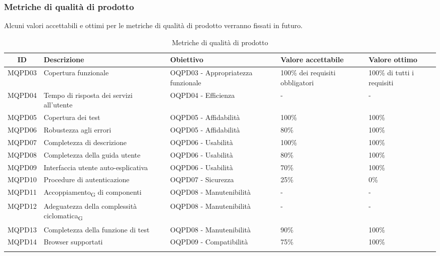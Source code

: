 \newpage
\subsubsection{Metriche di qualità di prodotto}
Alcuni valori accettabili e ottimi per le metriche di qualità di prodotto verranno fissati in futuro.
\begin{center}
	\setlength\extrarowheight{2pt}
	\begin{xltabular}{\textwidth}{|c|X|X|X|X|}
		\hline
		\textbf{ID} & \textbf{Descrizione} & \textbf{Obiettivo} & \textbf{Valore accettabile} & \textbf{Valore ottimo}\\
		\hline
		MQPD03 & Copertura funzionale & OQPD03 - Appropriatezza funzionale & 100\% dei requisiti obbligatori & 100\% di tutti i requisiti\\
		\hline
		MQPD04 & Tempo di risposta dei servizi all'utente & OQPD04 - Efficienza & - & - \\
		\hline
		MQPD05 & Copertura dei test & OQPD05 - Affidabilità & 100\% & 100\% \\
		\hline
		MQPD06 & Robustezza agli errori & OQPD05 - Affidabilità & 80\% & 100\% \\
		\hline
		MQPD07 & Completezza di descrizione & OQPD06 - Usabilità & 100\% &  100\% \\
		\hline
		MQPD08 & Completezza della guida utente & OQPD06 - Usabilità & 80\% &  100\% \\
		\hline
		MQPD09 & Interfaccia utente auto-esplicativa & OQPD06 - Usabilità & 70\% &  100\% \\
		\hline
		MQPD10 & Procedure di autenticazione & OQPD07 - Sicurezza & 25\% &  0\% \\
		\hline
		MQPD11 & Accoppiamento\textsubscript{G} di componenti & OQPD08 - Manutenibilità & - & - \\
		\hline
		MQPD12 & Adeguatezza della complessità ciclomatica\textsubscript{G} & OQPD08 - Manutenibilità & - & - \\
		\hline
		MQPD13 & Completezza della funzione di test & OQPD08 - Manutenibilità & 90\% & 100\% \\
		\hline
		MQPD14 & Browser supportati & OQPD09 - Compatibilità & 75\% & 100\% \\
		\hline
		\caption{Metriche di qualità di prodotto}
	\end{xltabular}
\end{center}
